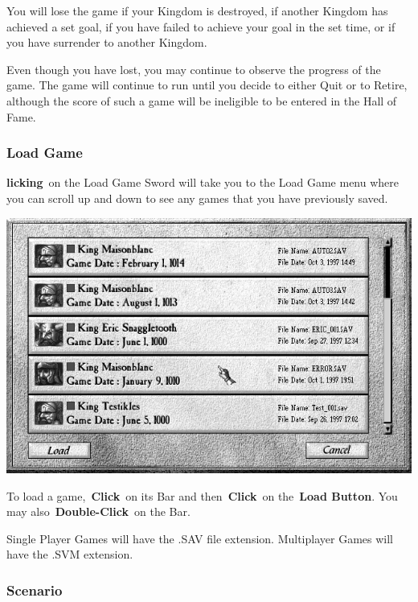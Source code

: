 You will lose the game if your Kingdom is destroyed, if another Kingdom has achieved a set goal, if you have failed to achieve your goal in the set time, or if you have surrender to another Kingdom.

Even though you have lost, you may continue to observe the progress of the game. The game will continue to run until you decide to either Quit or to Retire, although the score of such a game will be ineligible to be entered in the Hall of Fame.

\subsubsection{Load Game} %


\textbf{licking} on the Load Game Sword will take you to the Load Game menu where you can scroll up and down to see any games that you have previously saved.

\begin{center}
	\includegraphics[width=0.9\linewidth]{Iload} %
\end{center}

To load a game, \textbf{Click} on its Bar and then \textbf{Click} on the \textbf{Load Button}. You may also \textbf{Double-Click} on the Bar.

Single Player Games will have the .SAV file extension. Multiplayer Games will have the .SVM extension.

\subsubsection{Scenario}


